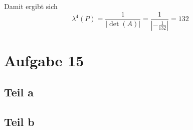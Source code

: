 \documentclass[10pt,a4paper]{article}
\begin{document}
Damit ergibt sich
\begin{equation}
  \lambda^{4}(P) = \frac{1}{|\det(A)|} = \frac{1}{|-\frac{1}{132}|} = 132
\end{equation}

\section{Aufgabe 15}

\subsection{Teil a}

\subsection{Teil b}
\end{document}
